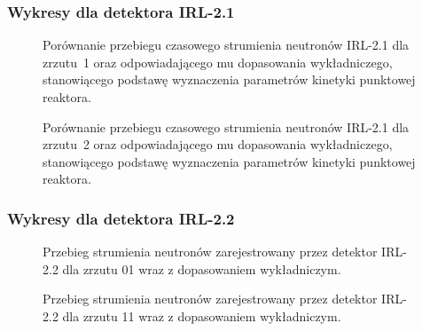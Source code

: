 


\subsubsection{Wykresy dla detektora IRL-2.1}
\begin{figure}[H]
	\centering
	\resizebox{\textwidth}{!}{}
	\caption{Porównanie przebiegu czasowego strumienia neutronów IRL-2.1 dla zrzutu~1 oraz odpowiadającego mu dopasowania wykładniczego, stanowiącego podstawę wyznaczenia parametrów kinetyki punktowej reaktora.}
	\label{fig:zrzut01}
\end{figure}


\begin{figure}[H]
	\centering
	\resizebox{\textwidth}{!}{}
	\caption{Porównanie przebiegu czasowego strumienia neutronów IRL-2.1 dla zrzutu~2 oraz odpowiadającego mu dopasowania wykładniczego, stanowiącego podstawę wyznaczenia parametrów kinetyki punktowej reaktora.}
	\label{fig:zrzut02}
\end{figure}



\subsubsection{Wykresy dla detektora IRL-2.2}

\begin{figure}[H]
	\centering
	\resizebox{\textwidth}{!}{}
	\caption{Przebieg strumienia neutronów zarejestrowany przez detektor IRL-2.2
		dla zrzutu 01 wraz z dopasowaniem wykładniczym.}
	\label{fig:IRL22_zrzut01}
\end{figure}


\begin{figure}[H]
	\centering
	\resizebox{\textwidth}{!}{}
	\caption{Przebieg strumienia neutronów zarejestrowany przez detektor IRL-2.2
		dla zrzutu 11 wraz z dopasowaniem wykładniczym.}
	\label{fig:IRL22_zrzut11}
\end{figure}

